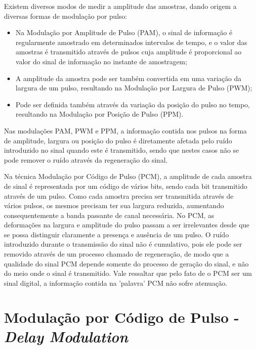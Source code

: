 \documentclass[journal]{IEEEtran}
\begin{document}
Existem diversos modos de medir a amplitude das amostras, dando origem a diversas formas de modulação por pulso:

\begin{itemize}
    \item Na Modulação por Amplitude de Pulso (PAM), o sinal de informação é regularmente amostrado em determinados intervalos de tempo, e o valor das amostras é transmitido através de pulsos cuja amplitude é proporcional ao valor do sinal de informação no instante de amostragem;

    \item A amplitude da amostra pode ser também convertida em uma variação da largura de um pulso, resultando na Modulação por Largura de Pulso (PWM);

    \item Pode ser definida também através da variação da posição do pulso no tempo, resultando na Modulação por Posição de Pulso (PPM).

\end{itemize}

Nas modulações PAM, PWM e PPM, a informação contida nos pulsos na forma de amplitude, largura ou posição do pulso é diretamente afetada pelo ruído introduzido no sinal quando este é transmitido, sendo que nestes casos não se pode remover o ruído através da regeneração do sinal.

Na técnica Modulação por Código de Pulso (PCM), a amplitude de cada amostra de sinal é representada por um código de vários bits, sendo cada bit transmitido através de um pulso.  Como cada amostra precisa ser transmitida através de vários pulsos, os mesmos precisam ter sua largura reduzida, aumentando consequentemente a banda passante de canal necessária. No PCM, as deformações na largura e amplitude do pulso passam a ser irrelevantes desde que se possa distinguir claramente a presença e ausência de um pulso. O ruído introduzido durante o transmissão do sinal não é cumulativo, pois ele pode ser removido através de um processo chamado de regeneração, de modo que a qualidade do sinal PCM depende somente do processo de geração do sinal, e não do meio onde o sinal é transmitido. Vale ressaltar que pelo fato de o PCM ser um sinal digital, a informação contida na 'palavra' PCM não sofre atenuação.

\section{Modulação por Código de Pulso - \textit{Delay Modulation}}
\end{document}

